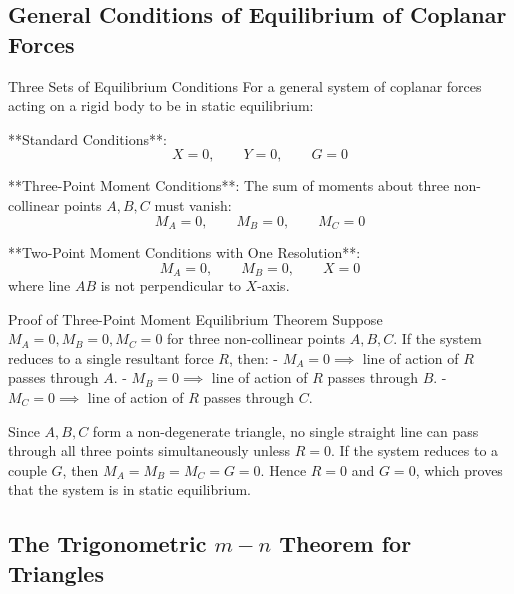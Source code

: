 \documentclass[11pt,a4paper]{article}
\begin{document}
\subsection{General Conditions of Equilibrium of Coplanar Forces}

\begin{importantbox}{Three Sets of Equilibrium Conditions}
For a general system of coplanar forces acting on a rigid body to be in static equilibrium:

**Standard Conditions**:
\begin{equation}
X = 0, \qquad Y = 0, \qquad G = 0
\end{equation}

**Three-Point Moment Conditions**:
The sum of moments about three non-collinear points $A, B, C$ must vanish:
\begin{equation}
M_A = 0, \qquad M_B = 0, \qquad M_C = 0
\end{equation}

**Two-Point Moment Conditions with One Resolution**:
\begin{equation}
M_A = 0, \qquad M_B = 0, \qquad X = 0
\end{equation}
where line $AB$ is not perpendicular to $X$-axis.
\end{importantbox}

\begin{proofbox}{Proof of Three-Point Moment Equilibrium Theorem}
Suppose $M_A = 0, M_B = 0, M_C = 0$ for three non-collinear points $A, B, C$.
If the system reduces to a single resultant force $R$, then:
- $M_A = 0 \implies$ line of action of $R$ passes through $A$.
- $M_B = 0 \implies$ line of action of $R$ passes through $B$.
- $M_C = 0 \implies$ line of action of $R$ passes through $C$.

Since $A, B, C$ form a non-degenerate triangle, no single straight line can pass through all three points simultaneously unless $R = 0$.
If the system reduces to a couple $G$, then $M_A = M_B = M_C = G = 0$.
Hence $R = 0$ and $G = 0$, which proves that the system is in static equilibrium.
\end{proofbox}

\subsection{The Trigonometric $m-n$ Theorem for Triangles}
\end{document}
